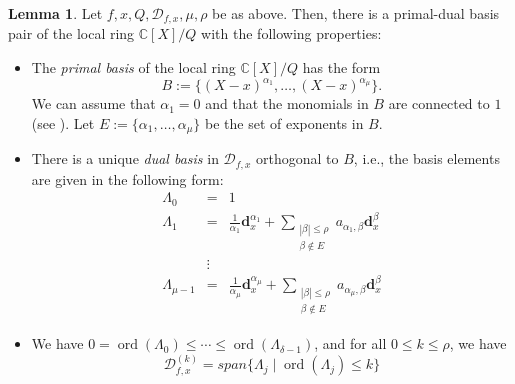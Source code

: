 \documentclass[12pt,oneside,reqno]{amsart}
\theoremstyle{definition}
\newtheorem{lem}[thm]{Lemma}
\DeclareMathOperator{\ord}{ord}
\begin{document}
\begin{lem}\cite[Lemma 4.1]{hauenstein2015certifying}
	Let $f,x,Q,\mathcal{D}_{f,x},\mu, \rho$ be as above. Then, there is a primal-dual basis pair of the local ring $\mathbb{C}[X]/Q$ with the following properties:
	\begin{itemize}
		\item The {\it primal basis} of the local ring $\mathbb{C}[X]/Q$ has the form
		\[B:=\{(X-x)^{\alpha_1},\dots, (X-x)^{\alpha_\mu}\}.\]
		We can assume that $\alpha_1=0$ and that the monomials in $B$ are connected to $1$ (see \cite{mourrain1999new}). Let $E:=\{\alpha_1,\dots, \alpha_\mu\}$ be the set of exponents in $B$.
		\item There is a unique {\it dual basis} in $\mathcal{D}_{f,x}$ orthogonal to $B$, i.e., the basis elements are given in the following form:
		\begin{eqnarray*}
		\Lambda_0 & = & 1\\
		\Lambda_1 & = & \frac{1}{\alpha_1}\mathbf{d}_x^{\alpha_1}+\sum\limits_{\substack{|\beta|\leq \rho\\ \beta \notin E}}a_{\alpha_1,\beta}\mathbf{d}^\beta_x\\
		&\vdots &\\
		\Lambda_{\mu-1} & = & \frac{1}{\alpha_{\mu}}\mathbf{d}_x^{\alpha_\mu}+\sum\limits_{\substack{|\beta|\leq \rho\\ \beta \notin E}}a_{\alpha_\mu,\beta}\mathbf{d}^\beta_x		
		\end{eqnarray*}
		\item We have $0=\ord(\Lambda_0)\leq \cdots \leq \ord(\Lambda_{\delta-1})$, and for all $0\leq k \leq \rho$, we have
		\[\mathcal{D}_{f,x}^{(k)}=span\{\Lambda_j\mid \ord(\Lambda_j)\leq k\}\]
	\end{itemize}
\end{lem}

\end{document}
